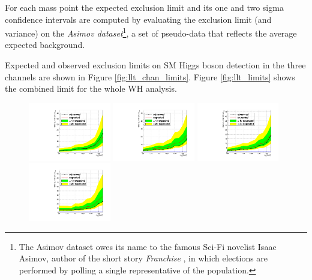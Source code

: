 For each mass point the expected exclusion limit and its one and two sigma confidence intervals are computed  by evaluating the exclusion limit (and variance) on the \emph{Asimov dataset}\footnote{The Asimov dataset owes its name to the famous Sci-Fi novelist Isaac Asimov, author of the short story \emph{Franchise} \cite{franchise}, in which elections are performed by polling a single representative of the population.}, a set of pseudo-data that reflects the average expected background. 

Expected and observed exclusion limits on SM Higgs boson detection in the three channels are shown in Figure \ref{fig:llt_chan_limits}. Figure \ref{fig:llt_limits} shows the combined limit for the whole WH analysis.

\begin{figure}
\begin{center}
  \includegraphics[width=0.32\textwidth]{4_Analisys/pics/limits/mmt/mmt_7TeV.pdf}
  \includegraphics[width=0.32\textwidth]{4_Analisys/pics/limits/mmt/mmt_8TeV.pdf}
  \includegraphics[width=0.32\textwidth]{4_Analisys/pics/limits/mmt/mmt.pdf} \\
  \includegraphics[width=0.32\textwidth]{4_Analisys/pics/limits/emt/emt_7TeV.pdf}

\end{center}
\end{figure}

